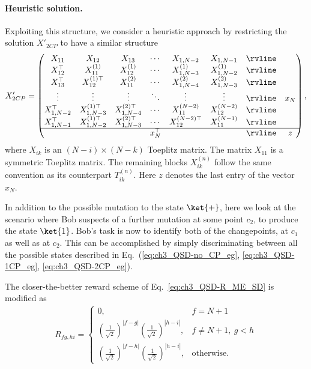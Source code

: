 \begin{appendices}
\paragraph{Heuristic solution.}

Exploiting this structure, we consider a heuristic approach by restricting the solution $X'_{2CP}$ to have a similar structure
\begin{align}
    \label{eq:ch3_QSD-X_2CP}
    X'_{2CP} =
    \begin{pmatrix}
        X_{11} & X_{12} & X_{13} & \cdots & X_{1,N-2} & X_{1,N-1} & \rvline & \\
        X_{12}^\top & X_{11}^{(1)} & X_{12}^{(1)} & \cdots & X_{1,N-3}^{(1)} & X_{1,N-2}^{(1)} & \rvline & \\
        X_{13}^\top & X_{12}^{(1)\top} & X_{11}^{(2)} & \cdots & X_{1,N-4}^{(2)} & X_{1,N-3}^{(2)} & \rvline \\
        \vdots & \vdots & \vdots & \ddots & \vdots & \vdots & \rvline & x_N \\
        X_{1,N-2}^\top & X_{1,N-3}^{(1)\top} & X_{1,N-4}^{(2)\top} & \cdots & X_{11}^{(N-2)} & X_{12}^{(N-2)} & \rvline & \\
        X_{1,N-1}^\top & X_{1,N-2}^{(1)\top} & X_{1,N-3}^{(2)\top} & \cdots & X_{12}^{(N-2)\top} & X_{11}^{(N-1)} & \rvline & \\
        \hline
         &  &  & x_N^\top &  &  & \rvline & z \\ 
    \end{pmatrix},
\end{align}
where $X_{ik}$ is an $(N-i) \times (N-k)$ Toeplitz matrix.
The matrix $X_{11}$ is a symmetric Toeplitz matrix.
The remaining blocks $X_{ik}^{(n)}$ follow the same convention as its counterpart $T_{ik}^{(n)}$. 
Here $z$ denotes the last entry of the vector $x_N$.

In addition to the possible mutation to the state $\ket{+}$, here we look at the scenario where Bob suspects of a further mutation at some point $c_2$, to produce the state $\ket{1}$.
Bob's task is now to identify both of the changepoints, at $c_1$ as well as at $c_2$.
This can be accomplished by simply discriminating between all the possible states described in Eq.~(\eqref{eq:ch3_QSD-no_CP_eg}, \eqref{eq:ch3_QSD-1CP_eg}, \eqref{eq:ch3_QSD-2CP_eg}).

The closer-the-better reward scheme of Eq.~\eqref{eq:ch3_QSD-R_ME_SD} is modified as
\begin{align}
    \label{eq:ch3_QSD-2CP_ctbr}
    R_{fg, hi} =
    \begin{cases}
        0, & f = N+1 \\
        \left( \frac{1}{\sqrt{2}} \right)^{|f-g|} \left( \frac{1}{\sqrt{2}} \right)^{|h-i|}, & f \ne N+1,\ g < h \\
        \left( \frac{1}{\sqrt{2}} \right)^{|f-h|} \left( \frac{1}{\sqrt{2}} \right)^{|h-i|}, & \text{otherwise}.
    \end{cases}
\end{align}


\end{appendices}
